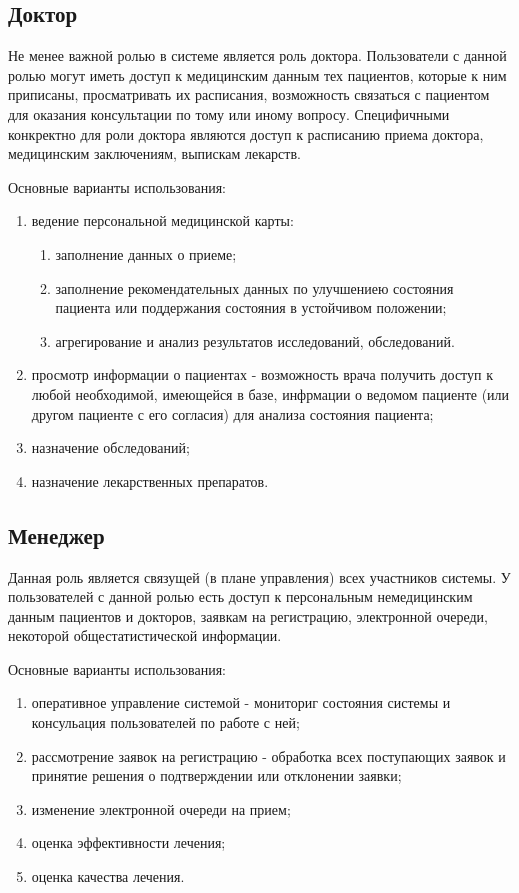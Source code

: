 \subsection{Доктор}
Не менее важной ролью в системе является роль доктора. Пользователи с данной ролью могут иметь доступ к медицинским данным тех пациентов, которые к ним приписаны, просматривать их расписания, возможность связаться с пациентом для оказания консультации по тому или иному вопросу. Специфичными конкректно для роли доктора являются доступ к расписанию приема доктора, медицинским заключениям, выпискам лекарств.

Основные варианты использования:	
\begin{enumerate}
  \item ведение персональной медицинской карты:
  \begin{enumerate}
  	\item заполнение данных о приеме;
  	\item заполнение рекомендательных данных по улучшениею состояния пациента
  	или поддержания состояния в устойчивом положении;
  	\item агрегирование и анализ результатов исследований, обследований.
  \end{enumerate}
  \item просмотр информации о пациентах - возможность врача получить доступ к
  любой необходимой, имеющейся в базе, инфрмации о ведомом пациенте (или другом
  пациенте с его согласия) для анализа состояния пациента;
  \item назначение обследований;
  \item назначение лекарственных препаратов. 
\end{enumerate}

\subsection{Менеджер}
Данная роль является связущей (в плане управления) всех участников системы. У
пользователей с данной ролью есть доступ к персональным немедицинским данным
пациентов и докторов, заявкам на регистрацию, электронной очереди, некоторой
общестатистической информации.

Основные варианты использования:

\begin{enumerate}
  \item оперативное управление системой - мониториг состояния системы и
  консульация пользователей по работе с ней;
  \item рассмотрение заявок на регистрацию - обработка всех поступающих заявок и
  принятие решения о подтверждении или отклонении заявки;
  \item изменение электронной очереди на прием;
  \item оценка эффективности лечения;
  \item оценка качества лечения.
\end{enumerate}

